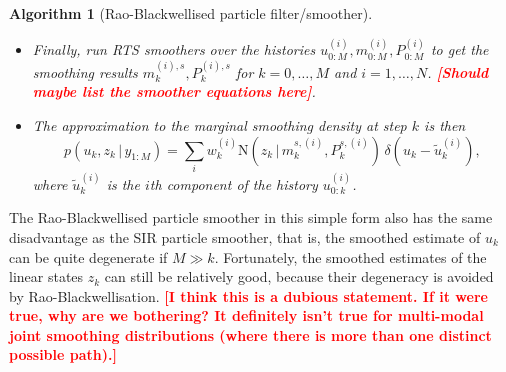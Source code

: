 \documentclass[twocolumn]{autart}    %
\newcommand{\comment}[1]{\textcolor{red}{\textbf{[#1]}}}
\newtheorem{algo}{Algorithm}[section]
\begin{document}
\begin{algo}[Rao-Blackwellised particle filter/smoother]
\begin{itemize}
\begin{enumerate}
\item Compute importance weights as follows:
  \begin{equation}
    w_k^{(i)} \propto w_{k-1}^{(i)}
     \frac{p(u_{k}^{(i)} \, | \, u_{k-1}^{(i)}) \,
          \mathrm{N}(y_k \, | \, \mu_k^{(i)},S_k^{(i)})}
          {q(u_{k}^{(i)} \, | \, u_{0:k-1}^{(i)},y_{1:k})}. \\
  \end{equation}

\item Resample the set of histories $\{
  w_k^{(i)},u_{0:k}^{(i)},m_{0:k}^{(i)},P_{0:k}^{(i)}~:~i=1,\ldots,N
  \}$ if needed.
\end{enumerate}

\item Finally, run RTS smoothers over the histories $u_{0:M}^{(i)}, m_{0:M}^{(i)}, P_{0:M}^{(i)}$
  to get the smoothing results $m_k^{(i),s},P_k^{(i),s}$ for $k=0,\ldots,M$ and $i=1,\ldots,N$.
  \comment{Should maybe list the smoother equations here}.

\item The approximation to the marginal smoothing density at step $k$
  is then
%
\begin{equation}
  p(u_k,z_k\,|\,y_{1:M})
  = \sum_i w_k^{(i)} \mathrm{N}(z_k\,|\,m_k^{s,(i)},P_k^{s,(i)}) \,
  \delta(u_k - \tilde{u}_k^{(i)}),
\nonumber
\end{equation}
%
where $\tilde{u}_k^{(i)}$ is the $i$th component of the history
$u_{0:k}^{(i)}$.
\end{itemize}
\end{algo}
%
The Rao-Blackwellised particle smoother in this simple form also has the same disadvantage as the SIR particle smoother, that is, the smoothed estimate of $u_{k}$ can be quite degenerate if $M \gg k$. Fortunately, the smoothed estimates of the linear states $z_k$ can still be relatively good, because their degeneracy is avoided by Rao-Blackwellisation. \comment{I think this is a dubious statement. If it were true, why are we bothering? It definitely isn't true for multi-modal joint smoothing distributions (where there is more than one distinct possible path).}
\end{document}
